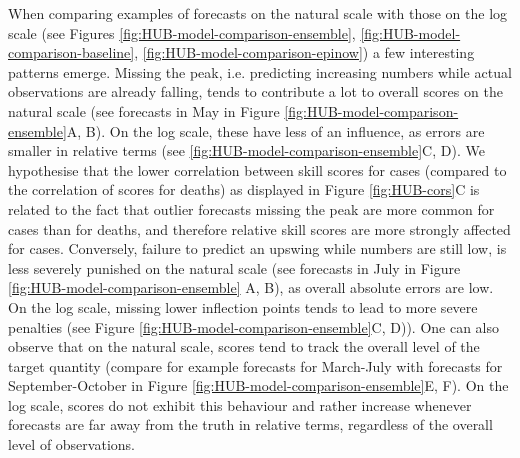 \documentclass{article}
\begin{document}
When comparing examples of forecasts on the natural scale with those on the log scale (see Figures \ref{fig:HUB-model-comparison-ensemble}, \ref{fig:HUB-model-comparison-baseline}, \ref{fig:HUB-model-comparison-epinow}) a few interesting patterns emerge. Missing the peak, i.e. predicting increasing numbers while actual observations are already falling, tends to contribute a lot to overall scores on the natural scale (see forecasts in May in Figure \ref{fig:HUB-model-comparison-ensemble}A, B). On the log scale, these have less of an influence, as errors are smaller in relative terms (see \ref{fig:HUB-model-comparison-ensemble}C, D). We hypothesise that the lower correlation between skill scores for cases (compared to the correlation of scores for deaths) as displayed in Figure \ref{fig:HUB-cors}C is related to the fact that outlier forecasts missing the peak are more common for cases than for deaths, and therefore relative skill scores are more strongly affected for cases. 
Conversely, failure to predict an upswing while numbers are still low, is less severely punished on the natural scale (see forecasts in July in Figure \ref{fig:HUB-model-comparison-ensemble} A, B), as overall absolute errors are low. On the log scale, missing lower inflection points tends to lead to more severe penalties (see Figure \ref{fig:HUB-model-comparison-ensemble}C, D)). One can also observe that on the natural scale, scores tend to track the overall level of the target quantity (compare for example forecasts for March-July with forecasts for September-October in Figure \ref{fig:HUB-model-comparison-ensemble}E, F). On the log scale, scores do not exhibit this behaviour and rather increase whenever forecasts are far away from the truth in relative terms, regardless of the overall level of observations. 
\end{document}
